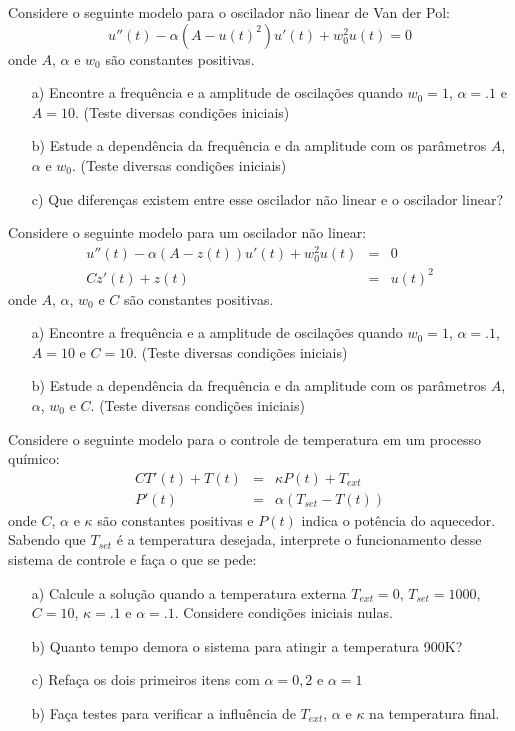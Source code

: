\begin{exer} Considere o seguinte modelo para o oscilador não linear de Van der Pol:
\begin{equation} u''(t) - \alpha (A-u(t)^2)u'(t) + w_0^2u(t)=0 \end{equation}
onde $A$, $\alpha$ e $w_0$ são constantes positivas.
\begin{itemize}
\item[a)] Encontre a frequência e a amplitude de oscilações quando $w_0=1$, $\alpha=.1$ e $A=10$. (Teste diversas condições iniciais)
\item[b)] Estude a dependência da frequência e da amplitude com os parâmetros  $A$, $\alpha$ e $w_0$. (Teste diversas condições iniciais)
\item[c)] Que diferenças existem entre esse oscilador não linear e o oscilador linear?
\end{itemize}
\end{exer}

\begin{exer} Considere o seguinte modelo para um oscilador não linear:
\begin{eqnarray}
u''(t)-\alpha(A-z(t))u'(t)+w_0^2 u(t)&=&0\\
Cz'(t)+z(t)&=&u(t)^2
\end{eqnarray}
onde $A$, $\alpha$, $w_0$ e $C$ são constantes positivas.
\begin{itemize}
\item[a)] Encontre a frequência e a amplitude de oscilações quando $w_0=1$, $\alpha=.1$, $A=10$ e $C=10$. (Teste diversas condições iniciais)
\item[b)] Estude a dependência da frequência e da amplitude com os parâmetros  $A$, $\alpha$, $w_0$ e $C$. (Teste diversas condições iniciais)
\end{itemize}
\end{exer}

\begin{exer} Considere o seguinte modelo para o controle de temperatura em um processo químico:
\begin{eqnarray}
CT'(t)+T(t)&=&\kappa P(t)+T_{ext}\\
P'(t)&=&\alpha(T_{set}-T(t))
\end{eqnarray}
onde $C$, $\alpha$ e $\kappa$ são constantes positivas e $P(t)$ indica o potência do aquecedor. Sabendo que $T_{set}$ é a temperatura desejada, interprete o funcionamento desse sistema de controle e faça o que se pede:
\begin{itemize}
\item[a)] Calcule a solução quando a temperatura externa $T_{ext}=0$, $T_{set}=1000$, $C=10$, $\kappa=.1$ e $\alpha=.1$. Considere condições iniciais nulas.
\item[b)] Quanto tempo demora o sistema para atingir a temperatura 900K?
\item[c)] Refaça os dois primeiros itens com $\alpha=0,2$ e $\alpha=1$
\item[b)] Faça testes para verificar a influência de $T_{ext}$, $\alpha$ e $\kappa$ na temperatura final.
\end{itemize}
\end{exer}

